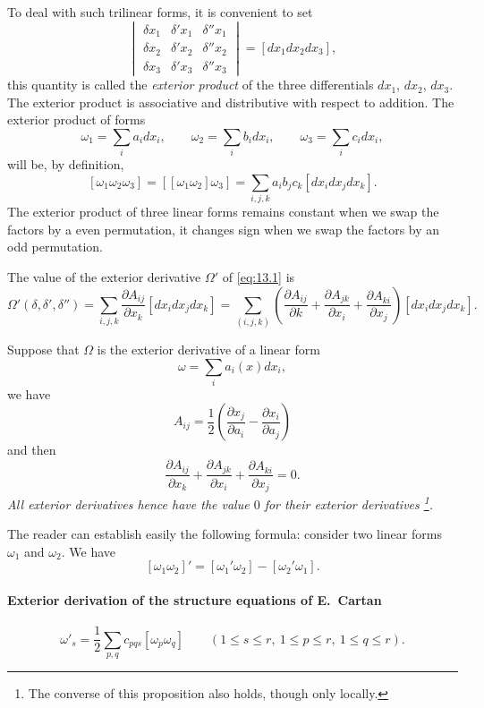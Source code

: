 \documentclass[leqno,11pt]{book}
\numberwithin{equation}{chapter}
\newcommand{\pd}{\partial}
\theoremstyle{shape1}
\theoremstyle{shapesmall}
\begin{document}
To deal with such trilinear forms, it is convenient to set
\[
\begin{vmatrix}
  \delta x_{1}&\delta'x_{1}&\delta''x_{1}\\
  \delta x_{2}&\delta'x_{2}&\delta''x_{2}\\
  \delta x_{3}&\delta'x_{3}&\delta''x_{3}  
\end{vmatrix}
=
[dx_{1}dx_{2}dx_{3}],
\]
this quantity is called the \emph{exterior product} of the three differentials $dx_{1}$, $dx_{2}$, $dx_{3}$. The exterior product is associative and distributive with respect to addition. The exterior product of forms\[
\omega_{1}=\sum_{i}a_{i}dx_{i},\qquad
\omega_{2}=\sum_{i}b_{i}dx_{i},\qquad
\omega_{3}=\sum_{i}c_{i}dx_{i},
\]
will be, by definition,
\[
[\omega_{1}\omega_{2}\omega_{3}]=[[\omega_{1}\omega_{2}]\omega_{3}]=\sum_{i,j,k}a_{i}b_{j}c_{k}[dx_{i}dx_{j}dx_{k}].
\]
The exterior product of three linear forms remains constant when we swap the factors by a even permutation, it changes sign when we swap the factors by an odd permutation.

The value of the exterior derivative $\Omega'$ of \eqref{eq:13.1} is
\[
\Omega'(\delta,\delta',\delta'')=\sum_{i,j,k}\frac{\pd A_{ij}}{\pd x_{k}}[dx_{i}dx_{j}dx_{k}]=\sum_{(i,j,k)}\left(\frac{\pd A_{ij}}{\pd k}+\frac{\pd A_{jk}}{\pd x_{i}}+\frac{\pd A_{ki}}{\pd x_{j}}\right)[dx_{i}dx_{j}dx_{k}].
\]

Suppose that $\Omega$ is the exterior derivative of a linear form
\[
\omega=\sum_{i}a_{i}(x)dx_{i},
\]
we have
\[
A_{ij}=\frac{1}{2}\left(\frac{\pd x_{j}}{\pd a_{i}}-\frac{\pd x_{i}}{\pd a_{j}}\right)
\]
and then
\[
\frac{\pd A_{ij}}{\pd x_{k}}+
\frac{\pd A_{jk}}{\pd x_{i}}+
\frac{\pd A_{ki}}{\pd x_{j}}=0.
\]
\emph{All exterior derivatives hence have the value $0$ for their exterior derivatives \footnote{The converse of this proposition also holds, though only locally.}.}

The reader can establish easily the following formula: consider two linear forms $\omega_{1}$ and $\omega_{2}$. We have
\begin{equation}
  \label{eq:13.3}
  [\omega_{1}\omega_{2}]'=[\omega_{1}'\omega_{2}]-[\omega_{2}'\omega_{1}].
\end{equation}

\paragraph{Exterior derivation of the structure equations of E.~Cartan}
\label{sec:198}
\[
\omega'_{s}=\frac{1}{2}\sum_{p,q}c_{pqs}[\omega_{p}\omega_{q}]\qquad(1\le s\le r,\ 1\le p\le r,\ 1\le q\le r).
\]
\end{document}
